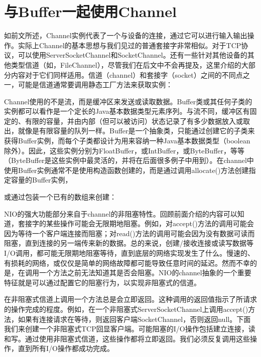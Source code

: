 \section{与Buffer一起使用Channel} 

	如前文所述，Channel实例代表了一个与设备的连接，通过它可以进行输入输出操作。实际上Channel的基本思想与我们见过的普通套接字非常相似。对于TCP协议，可以使用ServerSocketChannel和SocketChannel。还有一些针对其他设备的其他类型信道（如，FileChannel），尽管我们在后文中不会再提及，这里介绍的大部分内容对于它们同样适用。信道（channel）和套接字（socket）之间的不同点之一，可能是信道通常要调用静态工厂方法来获取实例： 

	

	Channel使用的不是流，而是缓冲区来发送或读取数据。Buffer类或其任何子类的实例都可以看作是一个定长的Java基本数据类型元素序列。与流不同，缓冲区有固定的、有限的容量，并由内部（但可以被访问）状态记录了有多少数据放入或取出，就像是有限容量的队列一样。Buffer是一个抽象类，只能通过创建它的子类来获得Buffer实例，而每个子类都设计为用来容纳一种Java基本数据类型（boolean除外）。因此，这些实例分别为FloatBuffer，或IntBuffer，或ByteBuffer，等等（ByteBuffer是这些实例中最灵活的，并将在后面很多例子中用到）。在channel中使用Buffer实例通常不是使用构造函数创建的，而是通过调用allocate()方法创建指定容量的Buffer实例， 

	

	或通过包装一个已有的数组来创建： 

	

	NIO的强大功能部分来自于channel的非阻塞特性。回顾前面介绍的内容可以知道，套接字的某些操作可能会无限期地阻塞。例如，对accept()方法的调用可能会因为等待一个客户端连接而阻塞；对read()方法的调用可能会因为没有数据可读而阻塞，直到连接的另一端传来新的数据。总的来说，创建/接收连接或读写数据等I/O调用，都可能无限期地阻塞等待，直到底层的网络实现发生了什么。慢速的、有损耗的网络，或仅仅是简单的网络故障都可能导致任意时间的延迟。然而不幸的是，在调用一个方法之前无法知道其是否会阻塞。NIO的channel抽象的一个重要特征就是可以通过配置它的阻塞行为，以实现非阻塞式的信道。 

	

	在非阻塞式信道上调用一个方法总是会立即返回。这种调用的返回值指示了所请求的操作完成的程度。例如，在一个非阻塞式ServerSocketChannel上调用accept()方法，如果有连接请求在等待，则返回客户端SocketChannel，否则返回null。下面我们来创建一个非阻塞式TCP回显客户端。可能阻塞的I/O操作包括建立连接，读和写。通过使用非阻塞式信道，这些操作都将立即返回。我们必须反复调用这些操作，直到所有I/O操作都成功完成。 


